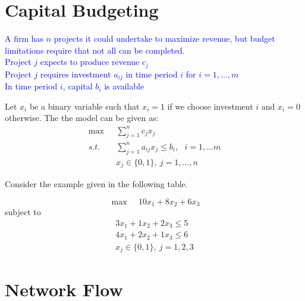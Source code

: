 \documentclass[../open-optimization/open-optimization.tex]{subfiles}
\begin{document}
\section{Capital Budgeting}
	\textcolor{blue}{A firm has $n$ projects it could undertake to maximize revenue, but budget limitations require that not all can be completed.}\\
	\textcolor{blue}{Project $j$ expects to produce revenue $c_j$\\
		Project $j$ requires investment $a_{ij}$ in time period $i$ for $i = 1,\ldots,m$\\
		In time period $i$, capital $b_i$ is available}
		
		Let $x_i$ be a binary variable such that $x_i = 1$ if we choose investment $i$ and $x_i = 0$ otherwise.  The the model can be given as:
	\begin{align*}
	\max ~~~& \sum_{j = 1}^n c_jx_j\\
	s.t. ~~~&\sum_{j = 1}^n a_{ij}x_j\leq b_i, ~~~i = 1,\ldots m\\
	& x_j \in \{0,1\} , \ j = 1,\ldots,n
	\end{align*}


Consider the example given in the following table.
	\begin{table}[h]
		\centering
	\end{table}
	$$
	\max~~~~~ 10x_1+8x_2+6x_3
	$$
	subject to
	\begin{align*}
	3x_1+1x_2+2x_3\leq5\\
	4x_1+2x_2+1x_3\leq6\\
	x_j \in \{0,1\},\  j = 1,2,3
	\end{align*}



\section{Network Flow}
\end{document}
